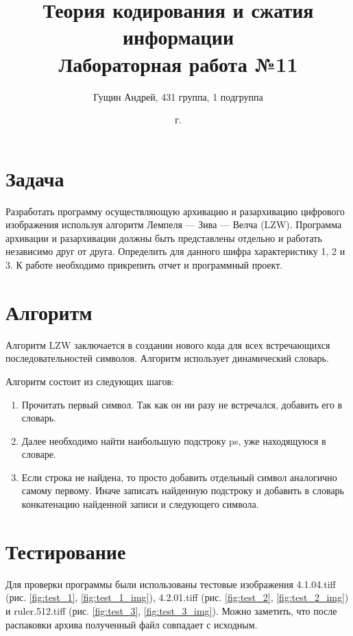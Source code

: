 \documentclass[a4paper,oneside]{article}
\title{{Теория кодирования и сжатия информации}\\{Лабораторная работа №11}}
\author{Гущин Андрей, 431 группа, 1 подгруппа}
\date{\the\year{} г.}
\theoremstyle{definition}
\begin{document}
\maketitle

\section{Задача}

Разработать программу осуществляющую архивацию и разархивацию цифрового
изображения используя алгоритм Лемпеля --- Зива --- Велча (LZW). Программа
архивации и разархивации должны быть представлены отдельно и работать независимо
друг от друга. Определить для данного шифра характеристику 1, 2 и 3. К работе
необходимо прикрепить отчет и программный проект.

\section{Алгоритм}

Алгоритм LZW заключается в создании нового кода для всех встречающихся
последовательностей символов. Алгоритм использует динамический словарь.

Алгоритм состоит из следующих шагов:
\begin{enumerate}
  \item
    Прочитать первый символ. Так как он ни разу не встречался, добавить его
    в словарь.
  \item
    Далее необходимо найти наибольшую подстроку ps, уже находящуюся в словаре.
  \item
    Если строка не найдена, то просто добавить отдельный символ аналогично
    самому первому. Иначе записать найденную подстроку и добавить в словарь
    конкатенацию найденной записи и следующего символа.
\end{enumerate}


\section{Тестирование}

Для проверки программы были использованы тестовые изображения 4.1.04.tiff
(рис. \ref{fig:test_1}, \ref{fig:test_1_img}), 4.2.01.tiff (рис.
\ref{fig:test_2}, \ref{fig:test_2_img}) и ruler.512.tiff (рис. \ref{fig:test_3},
\ref{fig:test_3_img}). Можно заметить, что после распаковки архива полученный
файл совпадает с исходным.
\end{document}
